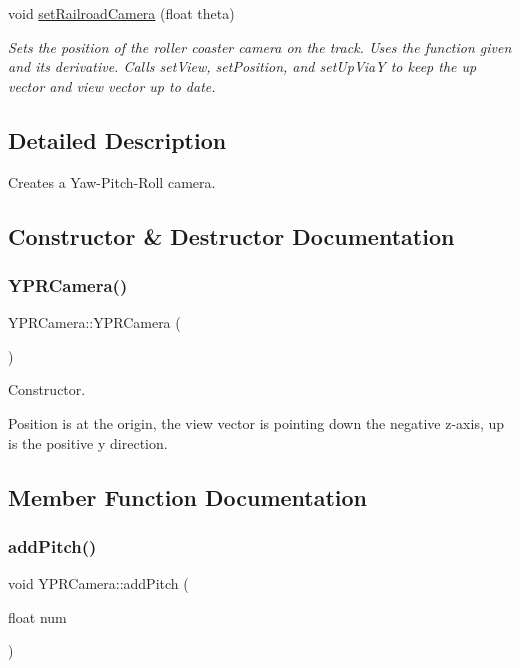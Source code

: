 \begin{DoxyCompactItemize}
void \hyperlink{class_y_p_r_camera_aecd1e5acbb07ca905a728a683233a14f}{set\+Railroad\+Camera} (float theta)
\begin{DoxyCompactList}\small\item\em Sets the position of the roller coaster camera on the track. Uses the function given and it\textquotesingle{}s derivative. Calls set\+View, set\+Position, and set\+Up\+ViaY to keep the up vector and view vector up to date. \end{DoxyCompactList}\end{DoxyCompactItemize}


\subsection{Detailed Description}
Creates a Yaw-\/\+Pitch-\/\+Roll camera. 

\subsection{Constructor \& Destructor Documentation}
\mbox{\label{class_y_p_r_camera_a65230f172270f51a11dec6750ef295d3}} 
\subsubsection{\texorpdfstring{Y\+P\+R\+Camera()}{YPRCamera()}}
{\footnotesize\ttfamily Y\+P\+R\+Camera\+::\+Y\+P\+R\+Camera (\begin{DoxyParamCaption}{ }\end{DoxyParamCaption})}



Constructor. 

Position is at the origin, the view vector is pointing down the negative z-\/axis, up is the positive y direction. 

\subsection{Member Function Documentation}
\mbox{\label{class_y_p_r_camera_ac301ce5ca1503a73cce5aa7a700c62e2}} 
\subsubsection{\texorpdfstring{add\+Pitch()}{addPitch()}}
{\footnotesize\ttfamily void Y\+P\+R\+Camera\+::add\+Pitch (\begin{DoxyParamCaption}\item[{float}]{num }\end{DoxyParamCaption})}



